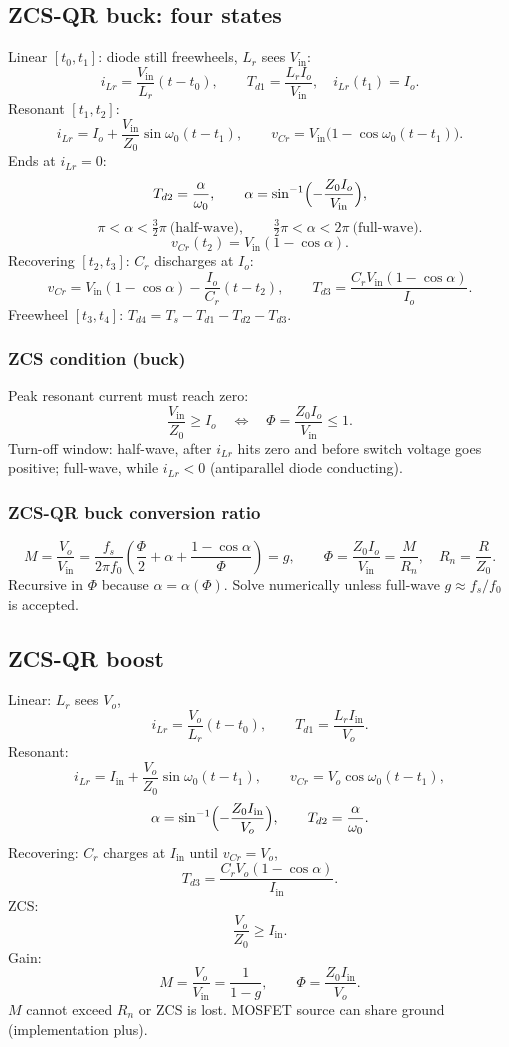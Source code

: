 \subsection{ZCS-QR buck: four states}
Linear \([t_0,t_1]\): diode still freewheels, \(L_r\) sees \(V_{\mathrm{in}}\):
\[
i_{Lr}=\frac{V_{\mathrm{in}}}{L_r}(t-t_0),\qquad T_{d1}=\frac{L_r I_o}{V_{\mathrm{in}}},\quad i_{Lr}(t_1)=I_o.
\]
Resonant \([t_1,t_2]\):
\[
i_{Lr}=I_o+\frac{V_{\mathrm{in}}}{Z_0}\sin\omega_0(t-t_1),\qquad
v_{Cr}=V_{\mathrm{in}}\bigl(1-\cos\omega_0(t-t_1)\bigr).
\]
Ends at \(i_{Lr}=0\):
\[
T_{d2}=\frac{\alpha}{\omega_0},\qquad \alpha=\sin^{-1}\Bigl(-\frac{Z_0 I_o}{V_{\mathrm{in}}}\Bigr),
\]
\[
\pi<\alpha<\tfrac32\pi\ \text{(half-wave)},\qquad \tfrac32\pi<\alpha<2\pi\ \text{(full-wave)}.
\]
\[
v_{Cr}(t_2)=V_{\mathrm{in}}(1-\cos\alpha).
\]
Recovering \([t_2,t_3]\): \(C_r\) discharges at \(I_o\):
\[
v_{Cr}=V_{\mathrm{in}}(1-\cos\alpha)-\frac{I_o}{C_r}(t-t_2),\qquad T_{d3}=\frac{C_r V_{\mathrm{in}}(1-\cos\alpha)}{I_o}.
\]
Freewheel \([t_3,t_4]\): \(T_{d4}=T_s-T_{d1}-T_{d2}-T_{d3}\).

\subsubsection{ZCS condition (buck)}
Peak resonant current must reach zero:
\[
\frac{V_{\mathrm{in}}}{Z_0}\ge I_o \quad\Leftrightarrow\quad \Phi=\frac{Z_0 I_o}{V_{\mathrm{in}}}\le 1.
\]
Turn-off window: half-wave, after \(i_{Lr}\) hits zero and before switch voltage goes positive; full-wave, while \(i_{Lr}<0\) (antiparallel diode conducting).

\subsubsection{ZCS-QR buck conversion ratio}
\[
M=\frac{V_o}{V_{\mathrm{in}}}=\frac{f_s}{2\pi f_0}\left(\frac{\Phi}{2}+\alpha+\frac{1-\cos\alpha}{\Phi}\right)=g,\qquad
\Phi=\frac{Z_0 I_o}{V_{\mathrm{in}}}=\frac{M}{R_n},\quad R_n=\frac{R}{Z_0}.
\]
Recursive in \(\Phi\) because \(\alpha=\alpha(\Phi)\). Solve numerically unless full-wave \(g\approx f_s/f_0\) is accepted.

\subsection{ZCS-QR boost}
Linear: \(L_r\) sees \(V_o\),
\[
i_{Lr}=\frac{V_o}{L_r}(t-t_0),\qquad T_{d1}=\frac{L_r I_{\mathrm{in}}}{V_o}.
\]
Resonant:
\[
i_{Lr}=I_{\mathrm{in}}+\frac{V_o}{Z_0}\sin\omega_0(t-t_1),\qquad v_{Cr}=V_o\cos\omega_0(t-t_1),
\]
\[
\alpha=\sin^{-1}\Bigl(-\frac{Z_0 I_{\mathrm{in}}}{V_o}\Bigr),\qquad T_{d2}=\frac{\alpha}{\omega_0}.
\]
Recovering: \(C_r\) charges at \(I_{\mathrm{in}}\) until \(v_{Cr}=V_o\),
\[
T_{d3}=\frac{C_r V_o(1-\cos\alpha)}{I_{\mathrm{in}}}.
\]
ZCS:
\[
\frac{V_o}{Z_0}\ge I_{\mathrm{in}}.
\]
Gain:
\[
M=\frac{V_o}{V_{\mathrm{in}}}=\frac{1}{1-g},\qquad \Phi=\frac{Z_0 I_{\mathrm{in}}}{V_o}.
\]
\(M\) cannot exceed \(R_n\) or ZCS is lost. MOSFET source can share ground (implementation plus).

